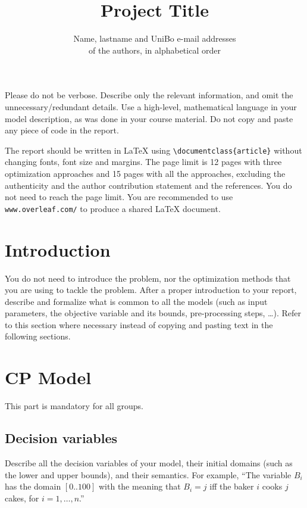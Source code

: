 \documentclass{article}
\title{Project Title}
\author{Name, lastname and UniBo e-mail addresses\\
of the authors, in alphabetical order}
\date{}
\begin{document}
\maketitle

\noindent
Please do not be verbose. Describe only the relevant information, and omit the unnecessary/redundant details. Use a high-level, mathematical language in your model description, as was done in your course material. Do not copy and paste any piece of code in the report.

\medskip

\noindent
The report should be written in \LaTeX{} using \verb|\documentclass{article}| without changing fonts, font size and margins. The page limit is 12 pages with three optimization approaches and 15 pages with all the approaches, excluding the authenticity and the author contribution statement and the references. You do not need to reach the page limit. You are recommended to use \texttt{www.overleaf.com/} to produce a shared \LaTeX{} document.

\section{Introduction}

You do not need to introduce the problem, nor the optimization methods that you are using to tackle the problem. After a proper introduction to your report, describe and formalize what is common to all the models (such as input parameters, the objective variable and its bounds, pre-processing steps, \dots). Refer to this section where necessary instead of copying and pasting text in the following sections.

\section{CP Model}

This part is mandatory for all groups.

\subsection{Decision variables}

Describe all the decision variables of your model, their initial domains (such as the lower and upper bounds), and their semantics. For example, ``The variable $B_i$ has the domain $[0..100]$ with the meaning that $B_i = j$ iff the baker $i$ cooks $j$ cakes, for $i = 1, \dots, n$.''
\end{document}
